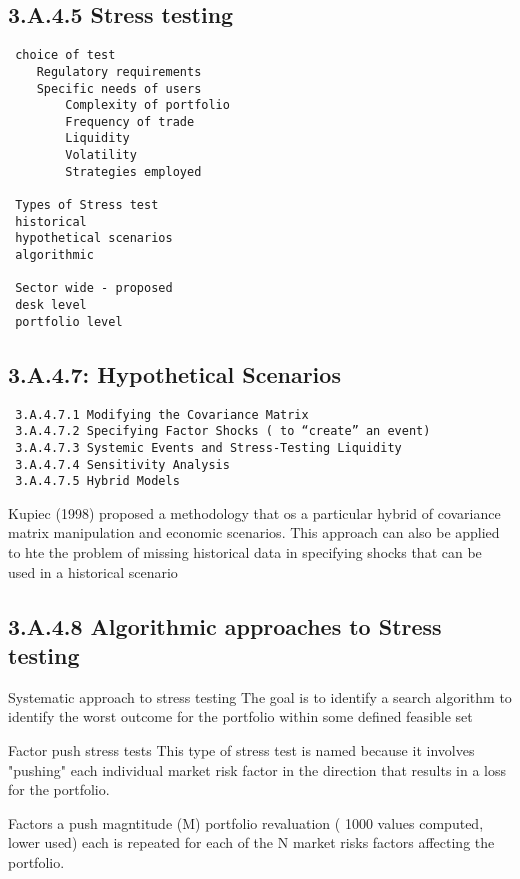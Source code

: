 \documentclass[]{report}
\begin{document}
 
\subsection{3.A.4.5 Stress testing}

\begin{verbatim}
 choice of test
 	Regulatory requirements
 	Specific needs of users
 		Complexity of portfolio
 		Frequency of trade
 		Liquidity
 		Volatility
 		Strategies employed
 
 Types of Stress test
 historical
 hypothetical scenarios
 algorithmic
 
 Sector wide - proposed
 desk level
 portfolio level
 \end{verbatim}
 
\subsection{3.A.4.7: Hypothetical Scenarios}
 
 \begin{verbatim}
 3.A.4.7.1 Modifying the Covariance Matrix
 3.A.4.7.2 Specifying Factor Shocks ( to “create” an event)
 3.A.4.7.3 Systemic Events and Stress-Testing Liquidity
 3.A.4.7.4 Sensitivity Analysis
 3.A.4.7.5 Hybrid Models
 \end{verbatim}
 
 Kupiec (1998) proposed a methodology that os a particular hybrid of covariance matrix manipulation and economic scenarios.
 This approach can also be applied to hte the problem of missing historical data in specifying shocks that can be used in a historical scenario
 
\subsection{3.A.4.8 Algorithmic approaches to Stress testing}

Systematic approach to stress testing
The goal is to identify a search algorithm to identify the worst outcome for the portfolio within some defined feasible set

Factor push stress tests
This type of stress test is named because it involves "pushing" each individual market risk factor in the direction that results in a loss for the portfolio.

Factors
a push magntitude (M)
portfolio revaluation ( 1000 values computed, lower used)
each is repeated for each of the N market risks factors affecting the portfolio.
\end{document}
